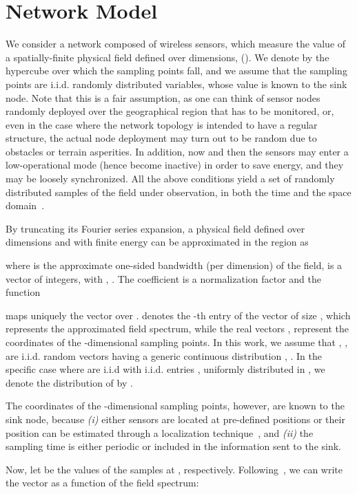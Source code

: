 \documentclass[11pt, draftcls, onecolumn, a4paper]{IEEEtran}
\begin{document}
\section{Network Model\label{sec:system}}

We consider a network composed of  wireless sensors, which measure
the value of a spatially-finite physical field defined over 
dimensions, ().  We denote by
 the hypercube over which
  the sampling points fall, and we assume that the sampling points are
  i.i.d. randomly distributed variables, whose value is known to the
  sink node.  Note that this is a fair assumption, as one can think of
  sensor nodes randomly deployed over the geographical region that has
  to be monitored, or, even in the case where the network topology is
  intended to have a regular structure, the actual node deployment may
  turn out to be random due to obstacles or terrain asperities.  In
  addition, now and then the sensors may enter a low-operational mode
  (hence become inactive) in order to save energy, and they may be
  loosely synchronized.  All the above conditions yield a set of
  randomly distributed samples of the field under observation, in both
  the time and the space domain~\cite{Ganesan03}.


By truncating its Fourier series expansion, a physical field defined
over  dimensions and with finite energy can be approximated in the
region  as \cite{TSP2}
  
where  is the approximate one-sided bandwidth (per dimension) of
the field,  is a vector of
integers, with , . The coefficient
 is a normalization factor and the function

maps uniquely the vector  over .  
 denotes the  -th entry of the 
vector  of size , which represents the approximated field spectrum, 
while the real vectors , 
represent the coordinates of the -dimensional sampling points. In
this work, we assume that , , are i.i.d. random
vectors having a generic continuous distribution ,
.  In the specific case where  are i.i.d with i.i.d.
entries , uniformly distributed in ,
  we denote the distribution of  by .

The coordinates of the -dimensional sampling points, however, 
are known to the sink node, because
{\em (i)} either sensors are located at pre-defined positions or their
position can be estimated through a localization
technique~\cite{Moore04}, and {\em (ii)} the sampling time is either
periodic or included in the information sent to the sink.

Now, let  be the values of
the samples at , respectively.
Following~\cite{TSP1,TSP2}, we can write the vector  as a
function of the field spectrum:
\end{document}
